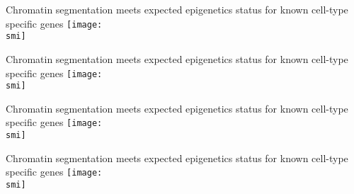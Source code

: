 \documentclass[10pt]{beamer}
\def\smi{out/ln/updir/mw-gcthesis-oral/library.bib}
\begin{document}
\begin{frame}{Chromatin segmentation meets expected epigenetics status for known cell-type specific genes}
  \def\smi{out/ln/updir/mw-gcthesis-oral/ink/chromatin-states/genome-view/t-lineage/3.pdf}
  \texttt{[image: \\smi]}
\end{frame}
\begin{frame}{Chromatin segmentation meets expected epigenetics status for known cell-type specific genes}
  \def\smi{out/ln/updir/mw-gcthesis-oral/ink/chromatin-states/genome-view/t-lineage/4.pdf}
  \texttt{[image: \\smi]}
\end{frame}
\begin{frame}{Chromatin segmentation meets expected epigenetics status for known cell-type specific genes}
  \def\smi{out/ln/updir/mw-gcthesis-oral/ink/chromatin-states/genome-view/t-lineage/5.pdf}
  \texttt{[image: \\smi]}
\end{frame}
\begin{frame}{Chromatin segmentation meets expected epigenetics status for known cell-type specific genes}
  \def\smi{out/ln/updir/mw-gcthesis-oral/ink/chromatin-states/genome-view/t-lineage/6.pdf}
  \texttt{[image: \\smi]}%
\end{frame}
\end{document}
